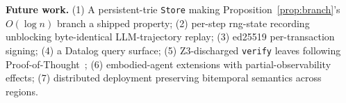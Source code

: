\documentclass[anon]{nesy2026}   %
\newcommand{\C}[1]{\texttt{#1}}
\begin{document}
\textbf{Future work.} (1) A persistent-trie \C{Store} making Proposition~\ref{prop:branch}'s $O(\log n)$ branch a shipped property; (2) per-step rng-state recording unblocking byte-identical LLM-trajectory replay; (3) ed25519 per-transaction signing; (4) a Datalog query surface; (5) Z3-discharged \C{verify} leaves following Proof-of-Thought~\citep{fan2024proofofthought}; (6) embodied-agent extensions with partial-observability effects; (7) distributed deployment preserving bitemporal semantics across regions.

\acks{%
}

\end{document}
